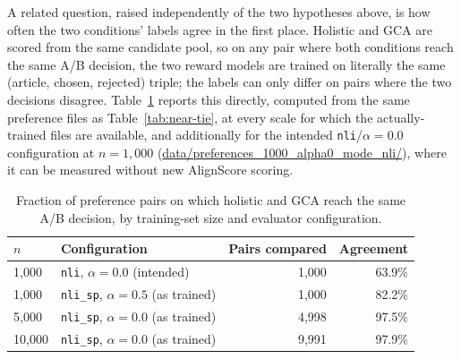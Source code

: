 A related question, raised independently of the two hypotheses above, is
how often the two conditions' labels agree in the first place. Holistic
and GCA are scored from the same candidate pool, so on any pair where both
conditions reach the same A/B decision, the two reward models are trained
on literally the same (article, chosen, rejected) triple; the labels can
only differ on pairs where the two decisions disagree. Table~\ref{tab:label-agreement}
reports this directly, computed from the same preference files as
Table~\ref{tab:near-tie}, at every scale for which the actually-trained
files are available, and additionally for the intended
\texttt{nli}/$\alpha=0.0$ configuration at $n=1{,}000$
(\url{data/preferences_1000_alpha0_mode_nli/}), where it can be measured
without new AlignScore scoring.

\begin{table}[htbp]
\centering
\caption[Holistic/GCA label agreement by scale and configuration]{Fraction of preference pairs on which holistic and GCA reach the
same A/B decision, by training-set size and evaluator configuration.}
\label{tab:label-agreement}
\begin{tabular}{llrr}
\toprule
$n$ & Configuration & Pairs compared & Agreement \\
\midrule
1{,}000  & \texttt{nli}, $\alpha=0.0$ (intended)   & 1{,}000 & 63.9\% \\
1{,}000  & \texttt{nli\_sp}, $\alpha=0.5$ (as trained) & 1{,}000 & 82.2\% \\
5{,}000  & \texttt{nli\_sp}, $\alpha=0.0$ (as trained) & 4{,}998 & 97.5\% \\
10{,}000 & \texttt{nli\_sp}, $\alpha=0.0$ (as trained) & 9{,}991 & 97.9\% \\
\bottomrule
\end{tabular}
\end{table}

